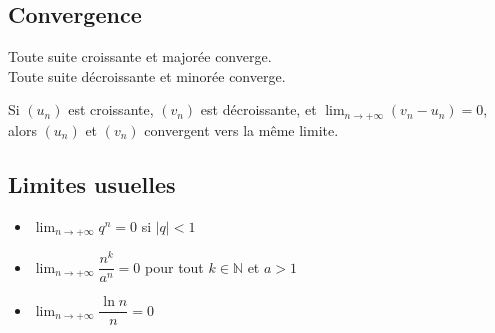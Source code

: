 \subsection{Convergence}

\begin{theoreme}
Toute suite croissante et majorée converge.\\
Toute suite décroissante et minorée converge.
\end{theoreme}

\begin{theoreme}
Si $(u_n)$ est croissante, $(v_n)$ est décroissante, et $\lim_{n \to +\infty}(v_n - u_n) = 0$,
alors $(u_n)$ et $(v_n)$ convergent vers la même limite.
\end{theoreme}

\subsection{Limites usuelles}

\begin{itemize}
\item $\lim_{n \to +\infty} q^n = 0$ si $|q| < 1$
\item $\lim_{n \to +\infty} \dfrac{n^k}{a^n} = 0$ pour tout $k \in \mathbb{N}$ et $a > 1$
\item $\lim_{n \to +\infty} \dfrac{\ln n}{n} = 0$
\end{itemize}
